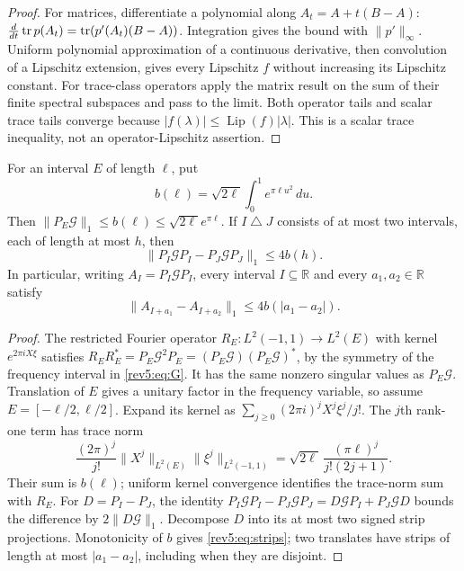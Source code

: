 \begin{proof}
For matrices, differentiate a polynomial along $A_t=A+t(B-A)$:
$\frac d{dt}\operatorname{tr} p(A_t)=\operatorname{tr}(p'(A_t)(B-A))$. Integration gives the
bound with $\|p'\|_\infty$. Uniform polynomial approximation of a
continuous derivative, then convolution of a Lipschitz extension,
gives every Lipschitz $f$ without increasing its Lipschitz constant.
For trace-class operators apply the matrix result on the sum of their
finite spectral subspaces and pass to the limit. Both operator tails
and scalar trace tails converge because
$|f(\lambda)|\le\operatorname{Lip}(f)|\lambda|$.
This is a scalar trace inequality, not an operator-Lipschitz assertion.
\end{proof}

\begin{lemma}\label{rev5:lem:strips}
For an interval $E$ of length $\ell$, put
\begin{equation}\label{rev5:eq:strip-function}
 b(\ell)=\sqrt{2\ell}\int_0^1e^{\pi\ell u^2}\,du.
\end{equation}
Then $\|P_E\mathcal G\|_1\leq b(\ell)
\leq\sqrt{2\ell}e^{\pi\ell}$.  If $I\mathbin\triangle J$ consists of
at most two intervals, each of length at most $h$, then
\begin{equation}\label{rev5:eq:strips}
 \|P_I\mathcal G P_I-P_J\mathcal G P_J\|_1\leq4b(h).
\end{equation}
In particular, writing $A_I=P_I\mathcal G P_I$, every interval
$I\subseteq\mathbb R$ and every $a_1,a_2\in\mathbb R$ satisfy
\begin{equation}\label{rev5:eq:translated-intervals}
 \|A_{I+a_1}-A_{I+a_2}\|_1\leq4b(|a_1-a_2|).
\end{equation}
\end{lemma}

\begin{proof}
The restricted Fourier operator $R_E:L^2(-1,1)\to L^2(E)$ with kernel
$e^{2\pi iX\xi}$ satisfies
$R_ER_E^*=P_E\mathcal G^2P_E
=(P_E\mathcal G)(P_E\mathcal G)^*$, by the symmetry of the frequency
interval in \eqref{rev5:eq:G}.  It has the same nonzero singular values
as $P_E\mathcal G$.  Translation of $E$ gives a unitary factor in the
frequency variable, so assume $E=[-\ell/2,\ell/2]$.  Expand its kernel as
$\sum_{j\geq0}(2\pi i)^jX^j\xi^j/j!$.  The $j$th rank-one term has
trace norm
\[
 \frac{(2\pi)^j}{j!}\|X^j\|_{L^2(E)}\|\xi^j\|_{L^2(-1,1)}
 =\sqrt{2\ell}\,\frac{(\pi\ell)^j}{j!(2j+1)}.
\]
Their sum is $b(\ell)$; uniform kernel convergence identifies the
trace-norm sum with $R_E$. For $D=P_I-P_J$, the identity
$P_I\mathcal G P_I-P_J\mathcal G P_J=D\mathcal G P_I+P_J\mathcal G D$
bounds the difference by $2\|D\mathcal G\|_1$. Decompose $D$ into its
at most two signed strip projections. Monotonicity of $b$ gives
\eqref{rev5:eq:strips}; two translates have strips of length at most
$|a_1-a_2|$, including when they are disjoint.
\end{proof}

